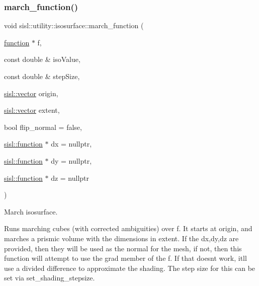 \subsubsection{\texorpdfstring{march\+\_\+function()}{march\_function()}}
{\footnotesize\ttfamily void sisl\+::utility\+::isosurface\+::march\+\_\+function (\begin{DoxyParamCaption}\item[{\hyperlink{classsisl_1_1function}{function} $\ast$}]{f,  }\item[{const double \&}]{iso\+Value,  }\item[{const double \&}]{step\+Size,  }\item[{\hyperlink{namespacesisl_a2069bd5374a9be042ff3ce3306d41e1a}{sisl\+::vector}}]{origin,  }\item[{\hyperlink{namespacesisl_a2069bd5374a9be042ff3ce3306d41e1a}{sisl\+::vector}}]{extent,  }\item[{bool}]{flip\+\_\+normal = {\ttfamily false},  }\item[{\hyperlink{classsisl_1_1function}{sisl\+::function} $\ast$}]{dx = {\ttfamily nullptr},  }\item[{\hyperlink{classsisl_1_1function}{sisl\+::function} $\ast$}]{dy = {\ttfamily nullptr},  }\item[{\hyperlink{classsisl_1_1function}{sisl\+::function} $\ast$}]{dz = {\ttfamily nullptr} }\end{DoxyParamCaption})\hspace{0.3cm}{\ttfamily [inline]}}



March isosurface. 

Runs marching cubes (with corrected ambiguities) over f. It starts at origin, and marches a prismic volume with the dimensions in extent. If the dx,dy,dz are provided, then they will be used as the normal for the mesh, if not, then this function will attempt to use the grad member of the f. If that doesn\textquotesingle{}t work, it\textquotesingle{}ll use a divided difference to approximate the shading. The step size for this can be set via set\+\_\+shading\+\_\+stepsize.



